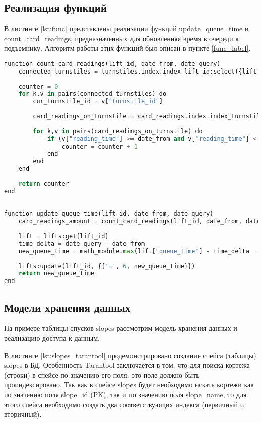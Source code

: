 \subsection{Реализация функций}

В листинге \ref{lst:func} представлены реализации функций update\_queue\_time и count\_card\_readings, предназначенных для обновленияя время в очереди к подъемнику. Алгоритм работы этих функций был описан в пункте \ref{func_label}.

\captionsetup{justification=centering,singlelinecheck=off}
\begin{lstlisting}[label=lst:func, caption=Функции update\_queue\_time и count\_card\_readings, language=python]
function count_card_readings(lift_id, date_from, date_query)
	connected_turnstiles = turnstiles.index.index_lift_id:select({lift_id})
	
	counter = 0
	for k,v in pairs(connected_turnstiles) do
		cur_turnstile_id = v["turnstile_id"]
		
		card_readings_on_turnstile = card_readings.index.index_turnstile:select({cur_turnstile_id})
		
		for k,v in pairs(card_readings_on_turnstile) do
			if (v["reading_time"] >= date_from and v["reading_time"] < date_query) then
				counter = counter + 1
			end
		end
	end
	
	return counter
end
 
 
function update_queue_time(lift_id, date_from, date_query)
	card_readings_amount = count_card_readings(lift_id, date_from, date_query)
	
	lift = lifts:get{lift_id}
	time_delta = date_query - date_from
	new_queue_time = math_module.max(lift["queue_time"] - time_delta  + (card_readings_amount * lift["lifting_time"] * 2 / lift["seats_amount"]), 0)
	
	lifts:update(lift_id, {{'=', 6, new_queue_time}})
	return new_queue_time
end
\end{lstlisting}

\subsection{Модели хранения данных}

На примере таблицы спусков slopes рассмотрим модель хранения данных и реализацию доступа к данным.

В листинге \ref{lst:slopes_tarantool} продемонстрировано создание спейса (таблицы) slopes в БД. Особенность Tarantool заключается в том, что для поиска кортежа (строки) в спейсе по значению его поля, это поле должно быть проиндексировано. Так как в спейсе slopes будет необходимо искать кортежи как по значению поля slope\_id (PK), так и по значению поля slope\_name, то для этого спейса необходимо создать два соответствующих индекса (первичный и вторичный).

